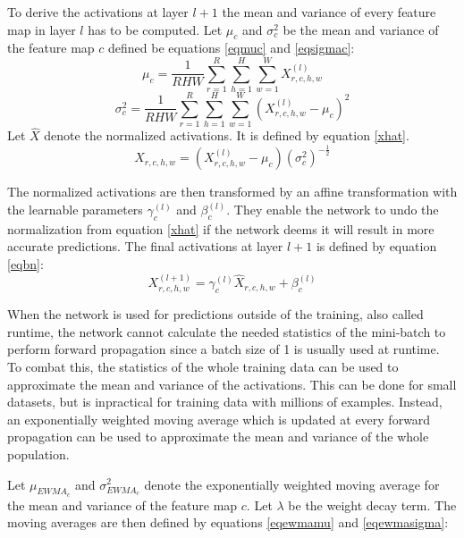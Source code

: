 \documentclass[a4paper, twoside]{article}
\begin{document}
To derive the activations at layer $l+1$ the mean and variance of every feature map in layer $l$ has to be computed. Let $\mu_c$ and $\sigma^2_c$ be the mean and variance of the feature map $c$ defined be equations \eqref{eqmuc} and \eqref{eqsigmac}: \cite{cs231n} \cite{batchnorm}
\begin{equation}\label{eqmuc}
\mu_c = \frac{1}{RHW} \sum^{R }_{r=1} \sum^{H }_{h=1} \sum^{W }_{w=1} X^{(l)}_{r,c,h,w}
\end{equation}
\begin{equation}\label{eqsigmac}
\sigma^2_c  = \frac{1}{RHW} \sum^{R }_{r=1} \sum^{H }_{h=1} \sum^{W }_{w=1} ({X^{(l)}_{r,c,h,w} - \mu_c})^2
\end{equation}
Let $\hat{X}$ denote the normalized activations. It is defined by equation \eqref{xhat}. \cite{cs231n} \cite{batchnorm}
\begin{equation}\label{xhat}
\hat{X}_{r,c,h,w} = (X^{(l)}_{r,c,h,w} - \mu_c){(\sigma^2_c)}^{-\frac{1}{2}}
\end{equation}

The normalized activations are then transformed by an affine transformation with the learnable parameters $\gamma_{c}^{(l)}$ and $\beta_{c}^{(l)}$. They enable the network to undo the normalization from equation \eqref{xhat} if the network deems it will result in more accurate predictions. The final activations at layer $l+1$ is defined by equation \eqref{eqbn}: \cite{cs231n} \cite{batchnorm}
\begin{equation}\label{eqbn}
X^{(l+1)}_{r,c,h,w} = \gamma_{c}^{(l)} \hat{X}_{r,c,h,w} + \beta_{c}^{(l)}
\end{equation}

When the network is used for predictions outside of the training, also called runtime, the network cannot calculate the needed statistics of the mini-batch to perform forward propagation since a batch size of 1 is usually used at runtime. To combat this, the statistics of the whole training data can be used to approximate the mean and variance of the activations. This can be done for small datasets, but is inpractical for training data with millions of examples. Instead, an exponentially weighted moving average which is updated at every forward propagation can be used to approximate the mean and variance of the whole population. \cite{cs231n} \cite{batchnorm}

Let $\mu_{EWMA_c}$ and $\sigma^2_{EWMA_c}$ denote the exponentially weighted moving average for the mean and variance of the feature map $c$. Let $\lambda$ be the weight decay term. The moving averages are then defined by equations \eqref{eqewmamu} and \eqref{eqewmasigma}:
\end{document}
